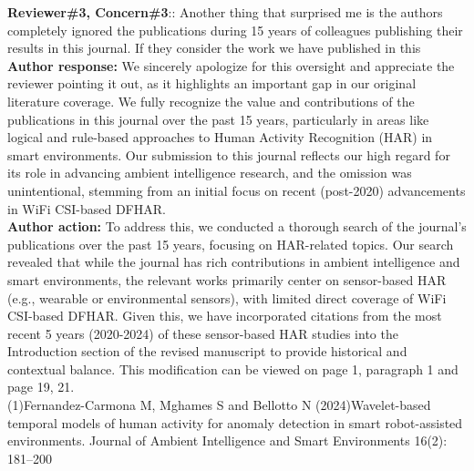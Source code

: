 \documentclass[Afour,sageh,times]{sagej}
\begin{document}
\textcolor{myGreen}{ \textbf{Reviewer\#3, Concern\#3}:: Another thing that surprised me is the authors completely ignored the publications during 15 years of colleagues publishing their results in this journal. If they consider the work we have published in this}  \\

\textbf{Author response:} We sincerely apologize for this oversight and appreciate the reviewer pointing it out, as it highlights an important gap in our original literature coverage. We fully recognize the value and contributions of the publications in this journal over the past 15 years, particularly in areas like logical and rule-based approaches to Human Activity Recognition (HAR) in smart environments. Our submission to this journal reflects our high regard for its role in advancing ambient intelligence research, and the omission was unintentional, stemming from an initial focus on recent (post-2020) advancements in WiFi CSI-based DFHAR.\\
\textbf{Author action:} To address this, we conducted a thorough search of the journal's publications over the past 15 years, focusing on HAR-related topics. Our search revealed that while the journal has rich contributions in ambient intelligence and smart environments, the relevant works primarily center on sensor-based HAR (e.g., wearable or environmental sensors), with limited direct coverage of WiFi CSI-based DFHAR. Given this, we have incorporated citations from the most recent 5 years (2020-2024) of these sensor-based HAR studies into the Introduction section of the revised manuscript  to provide historical and contextual balance. This modification can be viewed on page 1, paragraph 1 and page 19, 21.\\

(1)Fernandez-Carmona M, Mghames S and Bellotto N (2024)Wavelet-based temporal models of human activity for anomaly
detection in smart robot-assisted environments. Journal of Ambient Intelligence and Smart Environments 16(2): 181–200\\
\end{document}

